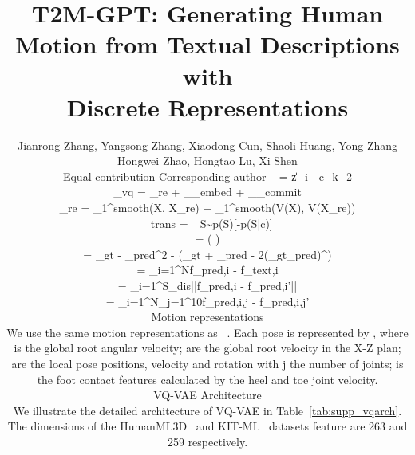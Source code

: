\documentclass[10pt,twocolumn,letterpaper]{article}
\begin{document}
\title{T2M-GPT: Generating Human Motion from Textual Descriptions with \\ Discrete Representations}

\author{Jianrong Zhang, 
Yangsong Zhang, 
Xiaodong Cun, Shaoli Huang, Yong Zhang \\ Hongwei Zhao, Hongtao Lu, Xi Shen \\
\small Equal contribution \qquad Corresponding author \
 =  \arg\min\|z_i - c_k\|_2
\label{formula:1}

_{vq} = _{re} + _{_{embed}} + \beta {}_{_{commit}}
\label{formula:2}

_{re} = _1^{smooth}(X, X_{re}) + \alpha {}_1^{smooth}(V(X), V(X_{re}))
\label{formula:3}

	_{trans} = _{S\sim p(S)}[-\log p(S|c)]
	\label{formula:5}

	 =  \left(  \right)
	\label{formula:causal}

 = \lVert \mu_{gt} - \mu_{pred}\rVert^2 - (\Sigma_{gt} + \Sigma_{pred} - 2(\Sigma_{gt}\Sigma_{pred})^{})
\label{formula:fid}

 = \sum_{i=1}^{N}\lVert f_{pred,i} - f_{text,i}\rVert
\label{formula:mm-dis}

 = \sum_{i=1}^{S_{dis}}||f_{pred,i} - f_{pred,i}'||
\label{formula:diversity}

 = \sum_{i=1}^{N}\sum_{j=1}^{10}\lVert f_{pred,i,j} - f_{pred,i,j}'\rVert
\label{formula:mmodality}



\subsection{Motion representations}

We use the same motion representations as ~\cite{guo2022generating}. Each pose is represented by , where  is the global root angular velocity;  are the global root velocity in the X-Z plan;  are the local pose positions, velocity and rotation with j the number of joints;  is the foot contact features calculated by the heel and toe joint velocity.



\section{VQ-VAE Architecture}
\label{sec:supp_vq_arch}
We illustrate the detailed architecture of VQ-VAE in Table~\ref{tab:supp_vqarch}. The dimensions of the HumanML3D~\cite{guo2022generating} and KIT-ML~\cite{plappert2016kit} datasets feature are 263 and 259 respectively.

}
\end{document}
